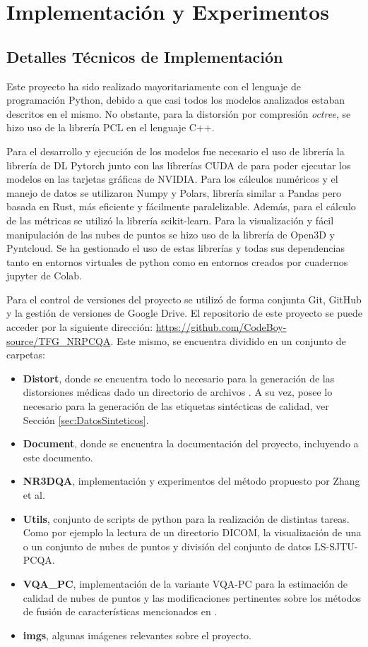 \chapter{Implementación y Experimentos} 
\label{sec:Implementacion}
\section{Detalles Técnicos de Implementación} 
Este proyecto ha sido realizado mayoritariamente con el lenguaje de programación Python, 
debido a que casi todos los modelos analizados estaban descritos en el mismo.
No obstante, para la distorsión por compresión \emph{octree}\cite{OctreeCompression}, 
se hizo uso de la librería PCL\cite{PCL} en el lenguaje C++.

Para el desarrollo y ejecución de los modelos fue necesario el uso de librería 
la librería de DL Pytorch junto con las librerías CUDA de para poder ejecutar 
los modelos en las tarjetas gráficas de NVIDIA. Para los cálculos numéricos y 
el manejo de datos se utilizaron Numpy y Polars, librería similar a Pandas 
pero basada en Rust, más eficiente y fácilmente paralelizable. Además, para el
cálculo de las métricas se utilizó la librería scikit-learn.
Para la visualización y fácil manipulación de las nubes de puntos se hizo uso 
de la librería de Open3D\cite{Open3D} y Pyntcloud.
Se ha gestionado el uso de estas librerías y todas sus dependencias tanto en entornos virtuales 
de python como en entornos creados por cuadernos jupyter de Colab.

Para el control de versiones del proyecto se utilizó de forma conjunta Git, GitHub
y la gestión de versiones de Google Drive. El repositorio de este proyecto se 
puede acceder por la siguiente dirección: \url{https://github.com/CodeBoy-source/TFG_NRPCQA}.
Este mismo, se encuentra dividido en un conjunto de carpetas: 
\begin{itemize}
  \item \textbf{Distort}, donde se encuentra todo lo necesario para la generación 
    de las distorsiones médicas dado un directorio de archivos . 
    A su vez, posee lo necesario para la generación de las etiquetas sintécticas 
    de calidad, ver Sección \ref{sec:DatosSinteticos}.
  \item \textbf{Document}, donde se encuentra la documentación del proyecto, 
    incluyendo a este documento. 
  \item \textbf{NR3DQA}, implementación y experimentos del método propuesto 
    por Zhang et al\cite{NR3DQA}.
  \item \textbf{Utils}, conjunto de scripts de python para la realización de distintas 
    tareas. Como por ejemplo la lectura de un directorio DICOM, la visualización 
    de una o un conjunto de nubes de puntos y división del conjunto de datos LS-SJTU-PCQA\cite{ResSCNN}.
  \item \textbf{VQA\_PC}, implementación de la variante VQA-PC\cite{VQA-PC} para 
    la estimación de calidad de nubes de puntos y las modificaciones pertinentes 
    sobre los métodos de fusión de características mencionados en \cite{EnsemblePCQA}. 
  \item \textbf{imgs}, algunas imágenes relevantes sobre el proyecto. 
\end{itemize}

